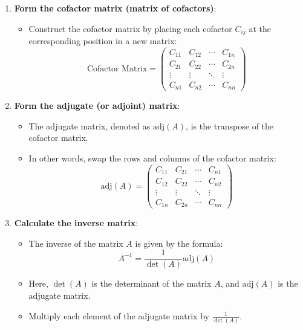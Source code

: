 \begin{process}
\begin{enumerate}
        \item \textbf{Form the cofactor matrix (matrix of cofactors)}:
        \begin{itemize}
            \item Construct the cofactor matrix by placing each cofactor \( C_{ij} \) at the corresponding position in a new matrix:
            \[
            \text{Cofactor Matrix} = \begin{pmatrix}
            C_{11} & C_{12} & \cdots & C_{1n} \\
            C_{21} & C_{22} & \cdots & C_{2n} \\
            \vdots & \vdots & \ddots & \vdots \\
            C_{n1} & C_{n2} & \cdots & C_{nn}
            \end{pmatrix}
            \]
        \end{itemize}
        
        \item \textbf{Form the adjugate (or adjoint) matrix}:
        \begin{itemize}
            \item The adjugate matrix, denoted as \( \text{adj}(A) \), is the transpose of the cofactor matrix.
            \item In other words, swap the rows and columns of the cofactor matrix:
            \[
            \text{adj}(A) = \begin{pmatrix}
            C_{11} & C_{21} & \cdots & C_{n1} \\
            C_{12} & C_{22} & \cdots & C_{n2} \\
            \vdots & \vdots & \ddots & \vdots \\
            C_{1n} & C_{2n} & \cdots & C_{nn}
            \end{pmatrix}
            \]
        \end{itemize}
        
        \item \textbf{Calculate the inverse matrix}:
        \begin{itemize}
            \item The inverse of the matrix \( A \) is given by the formula:
            \[
            A^{-1} = \frac{1}{\det(A)} \text{adj}(A)
            \]
            \item Here, \( \det(A) \) is the determinant of the matrix \( A \), and \( \text{adj}(A) \) is the adjugate matrix.
            \item Multiply each element of the adjugate matrix by \( \frac{1}{\det(A)} \).
        \end{itemize}
        

\end{enumerate}
\end{process}
